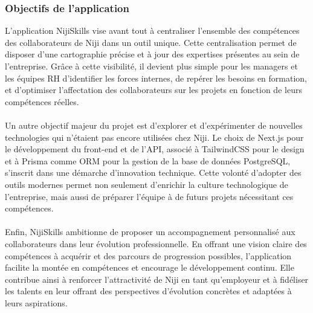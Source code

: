 \documentclass[12pt]{article}
\begin{document}
\subsubsection{Objectifs de l’application}
L’application NijiSkills vise avant tout à centraliser l’ensemble des compétences des collaborateurs de Niji dans un outil unique. Cette centralisation permet de disposer d’une cartographie précise et à jour des expertises présentes au sein de l’entreprise. Grâce à cette visibilité, il devient plus simple pour les managers et les équipes RH d’identifier les forces internes, de repérer les besoins en formation, et d’optimiser l’affectation des collaborateurs sur les projets en fonction de leurs compétences réelles.
\\\\
Un autre objectif majeur du projet est d’explorer et d’expérimenter de nouvelles technologies qui n’étaient pas encore utilisées chez Niji. Le choix de Next.js pour le développement du front-end et de l’API, associé à TailwindCSS pour le design et à Prisma comme ORM pour la gestion de la base de données PostgreSQL, s’inscrit dans une démarche d’innovation technique. Cette volonté d’adopter des outils modernes permet non seulement d’enrichir la culture technologique de l’entreprise, mais aussi de préparer l’équipe à de futurs projets nécessitant ces compétences.
\\\\
Enfin, NijiSkills ambitionne de proposer un accompagnement personnalisé aux collaborateurs dans leur évolution professionnelle. En offrant une vision claire des compétences à acquérir et des parcours de progression possibles, l’application facilite la montée en compétences et encourage le développement continu. Elle contribue ainsi à renforcer l’attractivité de Niji en tant qu’employeur et à fidéliser les talents en leur offrant des perspectives d’évolution concrètes et adaptées à leurs aspirations.
\end{document}
